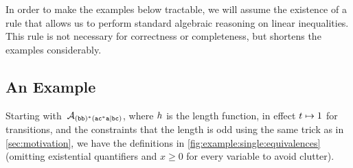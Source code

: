 \documentclass[acmsmall,review,anonymous,screen]{acmart}\settopmatter{printfolios=true,printccs=false,printacmref=true}
\theoremstyle{definition}
\begin{document}
In order to make the examples below tractable, we will assume the existence of a
rule \EquationReasoning{} that allows us to perform standard algebraic reasoning
on linear inequalities. This rule is not necessary for correctness or
completeness, but shortens the examples considerably.

\subsection{An Example}

Starting with~$\mathcal{A}_{\mathtt{(bb)^\ast(ac^\ast{}a|bc)}}{}$, where $h$ is the length function, in effect
$t \mapsto 1$ for transitions, and the constraints that the length is
odd using the same trick as in \cref{sec:motivation}, we have the
definitions in \cref{fig:example:single:equivalences} (omitting existential
quantifiers and $x \geq 0$ for every variable to avoid clutter).
\end{document}
